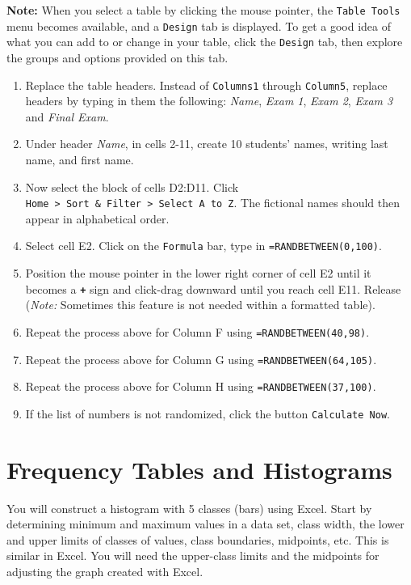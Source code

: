 \documentclass[
]{book}
\providecommand{\tightlist}{%
  \setlength{\itemsep}{0pt}\setlength{\parskip}{0pt}}
\begin{document}
\textbf{Note:} When you select a table by clicking the mouse pointer, the \texttt{Table\ Tools} menu becomes available, and a \texttt{Design} tab is displayed. To get a good idea of what you can add to or change in your table, click the \texttt{Design} tab, then explore the groups and options provided on this tab.

\begin{enumerate}
\def\labelenumi{\arabic{enumi}.}
\setcounter{enumi}{3}
\tightlist
\item
  Replace the table headers. Instead of \texttt{Columns1} through \texttt{Column5}, replace headers by typing in them the following: \emph{Name}, \emph{Exam 1}, \emph{Exam 2}, \emph{Exam 3} and \emph{Final Exam}.
\item
  Under header \emph{Name}, in cells 2-11, create 10 students' names, writing last name, and first name.
\item
  Now select the block of cells D2:D11. Click \texttt{Home\ \textgreater{}\ Sort\ \&\ Filter\ \textgreater{}\ Select\ A\ to\ Z}. The fictional names should then appear in alphabetical order.
\item
  Select cell E2. Click on the \texttt{Formula} bar, type in \texttt{=RANDBETWEEN(0,100)}.
\item
  Position the mouse pointer in the lower right corner of cell E2 until it becomes a \textbf{\texttt{+}} sign and click-drag downward until you reach cell E11. Release (\emph{Note:} Sometimes this feature is not needed within a formatted table).
\item
  Repeat the process above for Column F using \texttt{=RANDBETWEEN(40,98)}.
\item
  Repeat the process above for Column G using \texttt{=RANDBETWEEN(64,105)}.
\item
  Repeat the process above for Column H using \texttt{=RANDBETWEEN(37,100)}.
\item
  If the list of numbers is not randomized, click the button \texttt{Calculate\ Now}.
\end{enumerate}

\hypertarget{frequency-tables-and-histograms}{%
\chapter{Frequency Tables and Histograms}\label{frequency-tables-and-histograms}}

You will construct a histogram with 5 classes (bars) using Excel. Start by determining minimum and maximum values in a data set, class width, the lower and upper limits of classes of values, class boundaries, midpoints, etc. This is similar in Excel. You will need the upper-class limits and the midpoints for adjusting the graph created with Excel.
\end{document}
